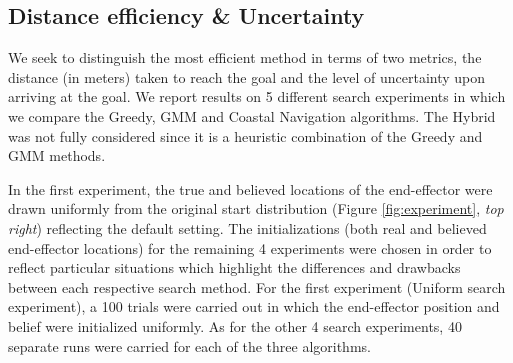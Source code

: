 \FloatBarrier
\subsection{Distance efficiency \& Uncertainty}\label{sub:time_uncertainty}

We seek to distinguish the most efficient method in terms of two metrics, the distance (in meters) taken to reach the goal
and the level of uncertainty upon arriving at the goal. We report results on 5 different search 
experiments in which we compare the Greedy, GMM and Coastal Navigation algorithms. The Hybrid was not fully considered since it 
is a heuristic combination of the Greedy and GMM methods. 

In the first experiment, the true and believed locations of the end-effector 
were drawn uniformly from the original start distribution (Figure \ref{fig:experiment}, \textit{top right}) 
reflecting the default setting. The initializations (both real and believed end-effector locations) for the 
remaining 4 experiments were chosen in order to reflect particular situations which highlight the differences 
and drawbacks between each respective search method.
For the first experiment (Uniform search experiment), a 100 trials were carried out in which the end-effector position and belief were 
initialized uniformly. As for the other 4 search experiments, 40 separate runs were carried for each of the three algorithms.

